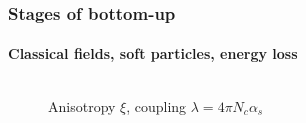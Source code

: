 \documentclass[aspectratio=169,11pt,usenames,dvipsnames]{beamer}
\begin{document}

\begin{frame}
    \frametitle{Stages of bottom-up}
    \framesubtitle{Classical fields, soft particles, energy loss}
    \vspace{-10pt}
    \begin{columns}[onlytextwidth,t]
       \begin{figure}
            \centering
            \captionsetup{justification=centering}
            \caption{\scriptsize Anisotropy $\xi$, coupling $\lambda=4\pi N_c \alpha_s$\vspace{-5pt}}

\end{figure}
\end{columns}
\end{frame}
\end{document}
